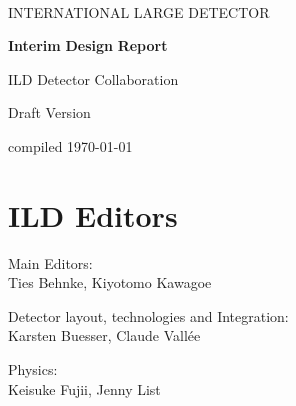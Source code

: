 %
%
\begin{titlepage}
\begin{center}
~
 ~\vskip 4cm

    {\huge  INTERNATIONAL} 
    {\huge  LARGE} 
    {\huge  DETECTOR}
    
  \vskip 1.2cm

    {\huge \bfseries Interim}
    {\huge \bfseries Design}
    {\huge \bfseries Report}

  \vskip 1.2cm




{\huge ILD Detector Collaboration} \\
    

\author{Contact:  Behnke, Deutsches Elektronen Synchroton, DESY}


  \vskip 3cm

{\huge }


    {\huge Draft Version}\\
    
  \vskip 1cm
    
    {\huge compiled \today}

\end{center}



\end{titlepage}

\newpage\thispagestyle{empty}
\cleardoublepage


\chapter*{ILD Editors}
\noindent Main Editors:\\
Ties Behnke, Kiyotomo Kawagoe

\vspace*{2mm}

\noindent Detector layout, technologies and Integration:\\
Karsten Buesser, Claude Vall\'ee

\vspace*{2mm}
\noindent Physics:\\
Keisuke Fujii, Jenny List

